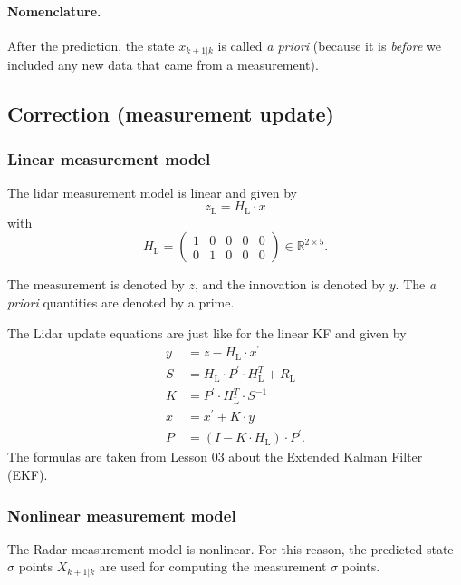 \documentclass{scrartcl}
\begin{document}
\paragraph{Nomenclature.}
After the prediction, the state $x_{k+1|k}$ is called \emph{a priori}
(because it is \emph{before} we included any new data that
came from a measurement).

\subsection{Correction (measurement update)}

\subsubsection{Linear measurement model}
The lidar measurement model is linear and given by
\begin{equation}
	z_\text{L} = H_\text{L} \cdot x
\end{equation}
with
\begin{equation}
	H_\text{L} = \left( \begin{array}{ccccc}
		1 & 0 & 0 & 0 & 0 \\
		0 & 1 & 0 & 0 & 0
	\end{array} \right) \in \mathbb{R}^{2 \times 5}.
\end{equation}

The measurement is denoted by $z$, and the innovation is denoted by $y$.
The \emph{a priori} quantities are denoted by a prime.

The Lidar update equations are just like for the linear KF and given by
\begin{align*}
	y &= z - H_\text{L} \cdot x^\prime \\
	S &= H_\text{L} \cdot P^\prime \cdot H_\text{L}^T + R_\text{L} \\
	K &= P^\prime \cdot H_\text{L}^T \cdot S^{-1} \\
	x &= x^\prime + K \cdot y \\
	P &= \left( I - K \cdot H_\text{L} \right) \cdot P^\prime.
\end{align*}
The formulas are taken from Lesson 03 about the Extended Kalman Filter (EKF).

\subsubsection{Nonlinear measurement model}
The Radar measurement model is nonlinear.
For this reason, the predicted state $\sigma$ points $X_{k+1|k}$
are used for computing the measurement $\sigma$ points.
\end{document}
